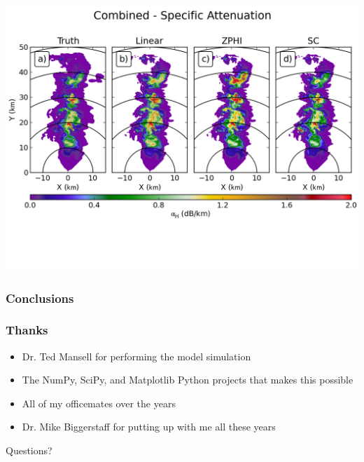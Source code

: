 \documentclass[red]{beamer}
\begin{document}
\begin{frame}
	\begin{center}
		\includegraphics[scale=0.55]{figures/C_Combined_Specific_Attenuation.png}
	\end{center}
\end{frame}

\begin{frame}
	\frametitle{Conclusions}
\end{frame}

\begin{frame}
	\frametitle{Thanks}
	\begin{itemize}
		\item Dr. Ted Mansell for performing the model simulation
		\item The NumPy, SciPy, and Matplotlib Python projects that makes this possible
		\item All of my officemates over the years
		\item Dr. Mike Biggerstaff for putting up with me all these years
	\end{itemize}
	\begin{center}
		\large{Questions?}
	\end{center}
\end{frame}
\end{document}
